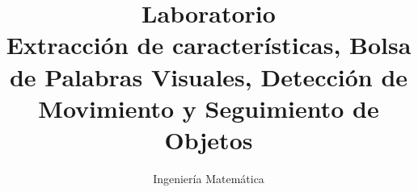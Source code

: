\documentclass{tudelft-report}
\begin{document}
\frontmatter

\title{\textbf{Laboratorio} \\ Extracción de características, Bolsa de Palabras Visuales, Detección de Movimiento y Seguimiento de Objetos}
\author{Ingeniería Matemática}

\subject{Visión por Ordenador I} %

\makecover


%
%

\tableofcontents

%


\mainmatter









\setcounter{biburlnumpenalty}{7000}
\setcounter{biburllcpenalty}{7000}
\setcounter{biburlucpenalty}{7000}




%
%
\end{document}
